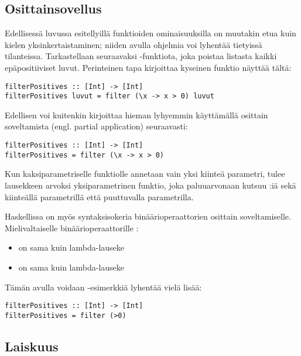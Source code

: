 \subsection{Osittainsovellus}
Edellisessä luvussa esitellyillä funktioiden ominaisuuksilla on muutakin etua
kuin kielen yksinkertaistaminen; niiden avulla ohjelmia voi lyhentää tietyissä tilanteissa.
Tarkastellaan seuraavaksi -funktiota, joka poistaa listasta kaikki
epäpositiiviset luvut.
Perinteinen tapa kirjoittaa kyseinen funktio näyttää tältä:

\begin{verbatim}
filterPositives :: [Int] -> [Int]
filterPositives luvut = filter (\x -> x > 0) luvut
\end{verbatim}

Edellisen voi kuitenkin kirjoittaa hieman lyhyemmin käyttämällä osittain soveltamista
(engl. partial application) seuraavasti:

\begin{verbatim}
filterPositives :: [Int] -> [Int]
filterPositives = filter (\x -> x > 0)
\end{verbatim}

Kun kaksiparametriselle funktiolle  annetaan vain yksi kiinteä parametri,
tulee lausekkeen arvoksi yksiparametrinen funktio,
joka paluuarvonaan kutsuu :iä sekä kiinteällä parametrillä että puuttuvalla parametrilla.

Haskellissa on myös syntaksisokeria binäärioperaattorien osittain soveltamiselle.
Mielivaltaiselle binäärioperaattorille :
\begin{itemize}
    \item {} on sama kuin lambda-lauseke 
    \item {} on sama kuin lambda-lauseke 
\end{itemize}

Tämän avulla voidaan -esimerkkiä lyhentää vielä lisää:
\begin{verbatim}
filterPositives :: [Int] -> [Int]
filterPositives = filter (>0)
\end{verbatim}

\subsection{Laiskuus}

